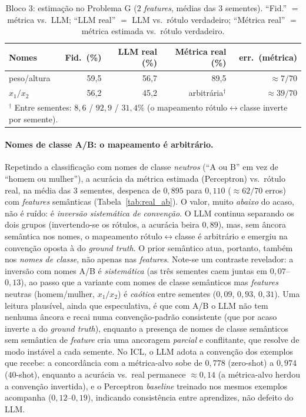 \documentclass[12pt,a4paper]{article}
\begin{document}
\begin{table}[ht]
\centering
\caption{Bloco 3: estimação no Problema G ($2$ \emph{features}, médias das $3$ sementes).
``Fid.'' $=$ métrica vs.\ LLM; ``LLM real'' $=$ LLM vs.\ rótulo verdadeiro; ``Métrica real''
$=$ métrica estimada vs.\ rótulo verdadeiro.}
\label{tab:real_a}
\begin{tabular}{lrrrr}
\toprule
\textbf{Nomes} & \textbf{Fid.\ (\%)} & \textbf{LLM real (\%)} &
\textbf{Métrica real (\%)} & \textbf{err.\ (métrica)} \\
\midrule
peso/altura & 59,5 & 56,7 & 89,5 & $\approx 7/70$ \\
$x_1/x_2$   & 56,2 & 45,2 & arbitrária$^\dagger$ & $\approx 39/70$ \\
\bottomrule
\multicolumn{5}{l}{\footnotesize $^\dagger$ Entre sementes: $8{,}6$ / $92{,}9$ / $31{,}4\%$
(o mapeamento rótulo$\leftrightarrow$classe inverte por semente).}
\end{tabular}
\end{table}

\paragraph{Nomes de classe A/B: o mapeamento é arbitrário.}
Repetindo a classificação com nomes de classe \emph{neutros} (``A ou B'' em vez de
``homem ou mulher''), a acurácia da métrica estimada (Perceptron) vs.\ rótulo real, na
média das $3$ sementes, despenca de $0{,}895$ para $0{,}110$ ($\approx 62/70$ erros) com
\emph{features} semânticas (Tabela~\ref{tab:real_ab}). O valor, muito \emph{abaixo} do
acaso, não é ruído: é \emph{inversão sistemática de convenção}. O LLM continua separando
os dois grupos (invertendo-se os rótulos, a acurácia beira $0{,}89$), mas, sem âncora
semântica nos nomes, o mapeamento rótulo$\leftrightarrow$classe é arbitrário e emergiu na
convenção oposta à do \emph{ground truth}. O prior semântico atua, portanto, também nos
\emph{nomes de classe}, não apenas nas \emph{features}. Note-se um contraste revelador: a
inversão com nomes A/B é \emph{sistemática} (as três sementes caem juntas em $0{,}07$–$0{,}13$),
ao passo que a variante com nomes de classe semânticos mas \emph{features} neutras
(homem/mulher, $x_1/x_2$) é \emph{caótica} entre sementes ($0{,}09$, $0{,}93$, $0{,}31$).
Uma leitura plausível, ainda que especulativa, é que com A/B o LLM não tem nenhuma âncora e
recai numa convenção-padrão consistente (que por acaso inverte a do \emph{ground truth}),
enquanto a presença de nomes de classe semânticos sem semântica de \emph{feature} cria uma
ancoragem \emph{parcial} e conflitante, que resolve de modo instável a cada semente. No ICL,
o LLM adota a convenção dos
exemplos que recebe: a concordância com a métrica-alvo sobe de $0{,}778$ (zero-shot) a
$0{,}974$ ($40$-shot), enquanto a acurácia vs.\ real permanece $\approx 0{,}14$ (a
métrica-alvo herdou a convenção invertida), e o Perceptron \emph{baseline} treinado nos
mesmos exemplos acompanha ($0{,}12$–$0{,}19$), indicando consistência entre aprendizes, não
defeito do LLM.
\end{document}
